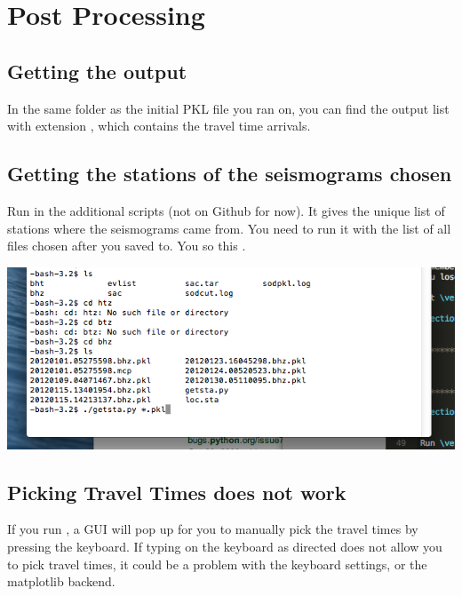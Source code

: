 \documentclass[letterpaper,10pt,english]{sphinxmanual}
\begin{document}
\section{Post Processing}
\label{docfiles/PickingTravelTimes:post-processing}

\subsection{Getting the output}
\label{docfiles/PickingTravelTimes:getting-the-output}
In the same folder as the initial PKL file you ran  on, you can find the output list with extension , which contains the travel time arrivals.


\subsection{Getting the stations of the seismograms chosen}
\label{docfiles/PickingTravelTimes:getting-the-stations-of-the-seismograms-chosen}
Run  in the additional scripts (not on Github for now). It gives the unique list of stations where the seismograms came from. You need to run it with the list of all  files chosen after you saved to. You so this .

\includegraphics{count_stations.png}


\subsection{Picking Travel Times does not work}
\label{docfiles/PickingTravelTimes:picking-travel-times-does-not-work}
If you run , a GUI will pop up for you to manually pick the travel times by pressing the keyboard. If typing on the keyboard as directed does not allow you to pick travel times, it could be a problem with the keyboard settings, or the matplotlib backend.
\end{document}
